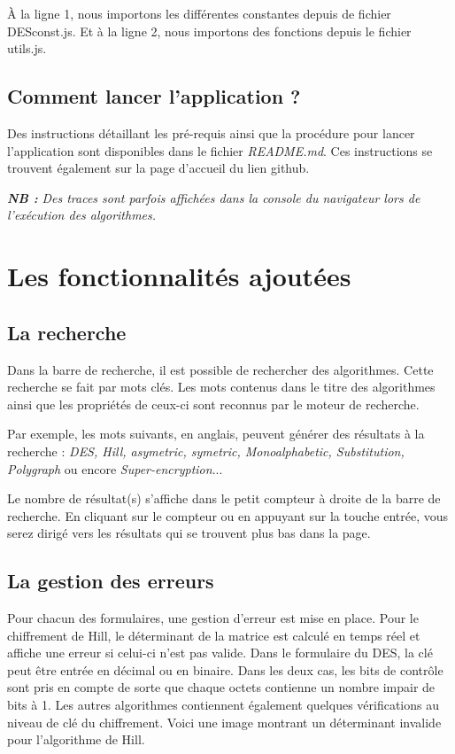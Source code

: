 \documentclass{article}
\begin{document}
À la ligne 1, nous importons les différentes constantes depuis de fichier DESconst.js. Et à la ligne 2, nous importons des fonctions depuis le fichier utils.js. 


\subsection{Comment lancer l'application ?}
Des instructions détaillant les pré-requis ainsi que la procédure pour lancer l'application sont disponibles dans le fichier \textit{README.md}. Ces instructions se trouvent également sur la page d'accueil du lien github\cite{GitHub}.

\textit{\textbf{NB : }} \textit{Des traces sont parfois affichées dans la console du navigateur lors de l'exécution des algorithmes.}


\section{Les fonctionnalités ajoutées}
\subsection{La recherche}
Dans la barre de recherche, il est possible de rechercher des algorithmes. Cette recherche se fait par mots clés. Les mots contenus dans le titre des algorithmes ainsi que les propriétés de ceux-ci sont reconnus par le moteur de recherche.

Par exemple, les mots suivants, en anglais, peuvent générer des résultats à la recherche : \textit{DES, Hill, asymetric, symetric, Monoalphabetic, Substitution, Polygraph} ou encore\textit{ Super-encryption}... 

Le nombre de résultat(s) s'affiche dans le petit compteur à droite de la barre de recherche. En cliquant sur le compteur ou en appuyant sur la touche entrée, vous serez dirigé vers les résultats qui se trouvent plus bas dans la page.

\subsection{La gestion des erreurs}
Pour chacun des formulaires, une gestion d'erreur est mise en place. Pour le chiffrement de Hill, le déterminant de la matrice est calculé en temps réel et affiche une erreur si celui-ci n'est pas valide. Dans le formulaire du DES, la clé peut être entrée en décimal ou en binaire. Dans les deux cas, les bits de contrôle sont pris en compte de sorte que chaque octets contienne un nombre impair de bits à 1. Les autres algorithmes contiennent également quelques vérifications au niveau de clé du chiffrement. Voici une image montrant un déterminant invalide pour l'algorithme de Hill.
\end{document}
